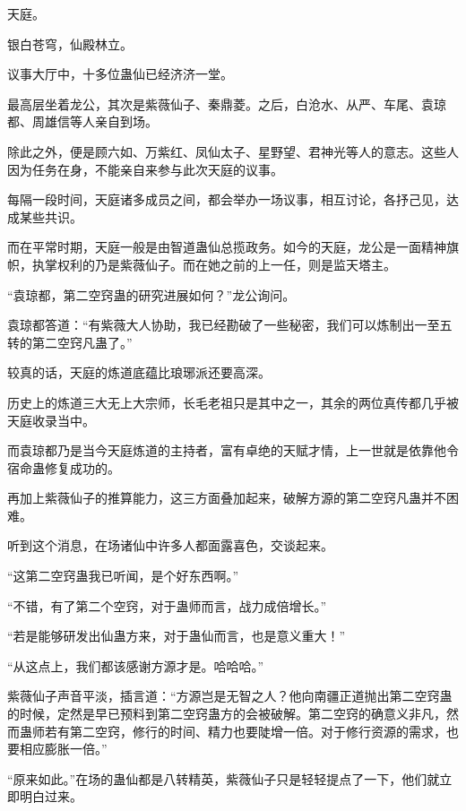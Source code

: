 
\begin{this_body}



天庭。

银白苍穹，仙殿林立。

议事大厅中，十多位蛊仙已经济济一堂。

最高层坐着龙公，其次是紫薇仙子、秦鼎菱。之后，白沧水、从严、车尾、袁琼都、周雄信等人亲自到场。

除此之外，便是顾六如、万紫红、凤仙太子、星野望、君神光等人的意志。这些人因为任务在身，不能亲自来参与此次天庭的议事。

每隔一段时间，天庭诸多成员之间，都会举办一场议事，相互讨论，各抒己见，达成某些共识。

而在平常时期，天庭一般是由智道蛊仙总揽政务。如今的天庭，龙公是一面精神旗帜，执掌权利的乃是紫薇仙子。而在她之前的上一任，则是监天塔主。

“袁琼都，第二空窍蛊的研究进展如何？”龙公询问。

袁琼都答道：“有紫薇大人协助，我已经勘破了一些秘密，我们可以炼制出一至五转的第二空窍凡蛊了。”

较真的话，天庭的炼道底蕴比琅琊派还要高深。

历史上的炼道三大无上大宗师，长毛老祖只是其中之一，其余的两位真传都几乎被天庭收录当中。

而袁琼都乃是当今天庭炼道的主持者，富有卓绝的天赋才情，上一世就是依靠他令宿命蛊修复成功的。

再加上紫薇仙子的推算能力，这三方面叠加起来，破解方源的第二空窍凡蛊并不困难。

听到这个消息，在场诸仙中许多人都面露喜色，交谈起来。

“这第二空窍蛊我已听闻，是个好东西啊。”

“不错，有了第二个空窍，对于蛊师而言，战力成倍增长。”

“若是能够研发出仙蛊方来，对于蛊仙而言，也是意义重大！”

“从这点上，我们都该感谢方源才是。哈哈哈。”

紫薇仙子声音平淡，插言道：“方源岂是无智之人？他向南疆正道抛出第二空窍蛊的时候，定然是早已预料到第二空窍蛊方的会被破解。第二空窍的确意义非凡，然而蛊师若有第二空窍，修行的时间、精力也要陡增一倍。对于修行资源的需求，也要相应膨胀一倍。”

“原来如此。”在场的蛊仙都是八转精英，紫薇仙子只是轻轻提点了一下，他们就立即明白过来。


\end{this_body}
